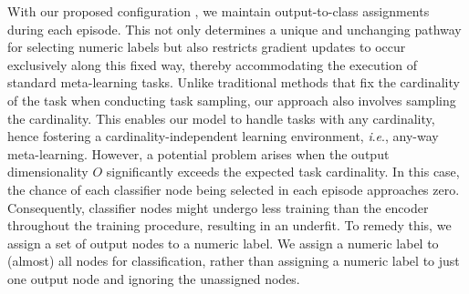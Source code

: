\documentclass[letterpaper]{article} %
\newcommand{\nj}[1]{\textcolor{red}{#1}}
\newcommand{\yr}[1]{\textcolor{magenta}{#1}}
\newcommand{\ie}{\textit{i}.\textit{e}., }
\begin{document}
With our proposed configuration %
, we maintain output-to-class assignments during each episode. This not only determines a unique and unchanging pathway for selecting numeric labels but also restricts gradient updates to occur exclusively along this fixed way, thereby accommodating the execution of standard meta-learning tasks. Unlike traditional methods that fix the cardinality of the task when conducting task sampling, our approach also involves sampling the cardinality. %
This enables our model to handle tasks with any cardinality, hence fostering a cardinality-independent learning environment, \ie any-way meta-learning. 
However, a potential problem arises when the output dimensionality $O$ significantly exceeds the expected task cardinality. In this case, the chance of each classifier node being selected %
in each episode approaches zero. Consequently, classifier nodes might undergo less training than the encoder throughout the training procedure, resulting in an underfit.
To remedy this, we assign a set of output nodes to a numeric label. We assign a numeric label to (almost) all nodes for classification, rather than assigning a numeric label to just one output node and ignoring the unassigned nodes.
\end{document}
